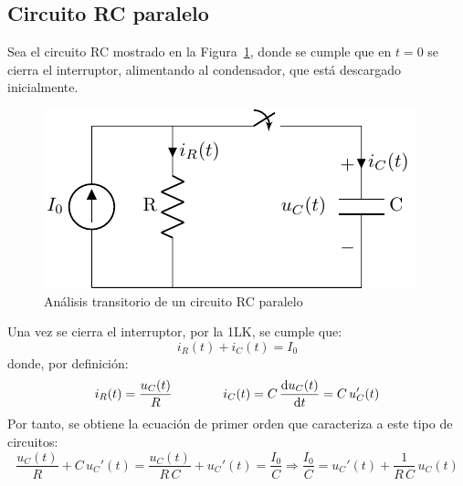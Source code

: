 \documentclass[11pt]{book} %
\begin{document}
	
    \subsection{Circuito RC paralelo}
	Sea el circuito RC mostrado en la Figura~\ref{fig.transitorio_RC}, donde se cumple que en $t = 0$ se cierra el interruptor, alimentando al condensador, que está descargado inicialmente. 
	\begin{figure}[htbp]
	    \centering
	    \includegraphics{../figs/transitorio_circuitoRC.pdf}
	    \caption{Análisis transitorio de un circuito RC paralelo}
	    \label{fig.transitorio_RC}
	\end{figure}
	
    Una vez se cierra el interruptor, por la 1LK, se cumple que:
	\begin{equation*}
	    i_R(t) + i_C(t) = I_0
	\end{equation*}
	donde, por definición: 
	\begin{equation*}
	    i_R(t)=\dfrac{u_C(t)}{R}\qquad\qquad i_C(t)=C\,\diff{u_C(t)}{t}=C\,u_C'(t)
	\end{equation*}
	Por tanto, se obtiene la ecuación de primer orden que caracteriza a este tipo de circuitos:
	\begin{equation}\label{eq.1orden_C}
	    \dfrac{u_C(t)}{R}+C\, u_C'(t)=\dfrac{u_C(t)}{R\,C}+u_C'(t)=\dfrac{I_0}{C}\Rightarrow \boxed{\dfrac{I_0}{C}=u_C'(t)+\dfrac{1}{R\, C}\,u_C(t)}
	\end{equation}
	
\end{document}
